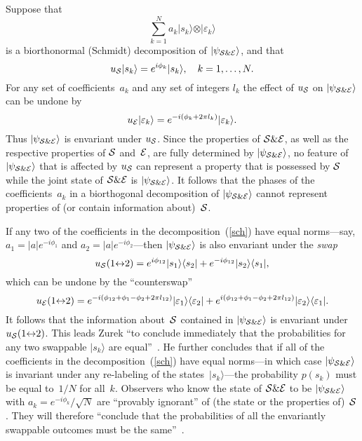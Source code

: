 \documentclass[12pt]{article}
\newcommand{\ket}[1]{\vert#1\rangle}
\newcommand{\ketbra}[2]{\vert#1\rangle\langle#2\vert}
\newcommand{\be}{\begin{equation}}
\newcommand{\ee}{\end{equation}}
\newcommand{\e}{\varepsilon}
\newcommand{\cS}{{\cal S}}
\newcommand{\E}{{\cal E}}
\begin{document}
Suppose that
\be
\sum_{k=1}^N a_k\ket{s_k}\otimes\ket{\e_k}\label{sch}
\ee
is a biorthonormal (Schmidt) decomposition of $\ket{\psi_{\cS\&\E}}$, and 
that
\be
u_\cS\ket{s_k}=e^{i\phi_k}\ket{s_k},\quad k=1,\dots,N.
\ee
For any set of coefficients~$a_k$ and any set of integers $l_k$ the effect of 
$u_\cS$ on $\ket{\psi_{\cS\&\E}}$ can be undone by
\be
u_\E\ket{\e_k}=e^{-i(\phi_k+2\pi l_k)}\ket{\e_k}.
\ee
Thus $\ket{\psi_{\cS\&\E}}$ is envariant under $u_\cS$. Since the properties 
of $\cS\&\E$, as well as the respective properties of $\cS$ and~$\E$, are fully 
determined by $\ket{\psi_{\cS\&\E}}$, no feature of $\ket{\psi_{\cS\&\E}}$ 
that is affected by $u_\cS$ can represent a property that is possessed by $\cS$ 
while the joint state of $\cS\&\E$ is $\ket{\psi_{\cS\&\E}}$. It follows that 
the phases of the coefficients~$a_k$ in a biorthogonal decomposition of 
$\ket{\psi_{\cS\&\E}}$ cannot represent properties of (or contain information 
about)~$\cS$.

If any two of the coefficients in the decomposition~(\ref{sch}) have equal 
norms---say, $a_1=|a|e^{-i\phi_1}$ and $a_2=|a|e^{-i\phi_2}$---then 
$\ket{\psi_{\cS\&\E}}$ is also envariant under the {\it swap\/}
\be
u_\cS(1{\leftrightarrow}2)=
e^{i\phi_{12}}\ketbra{s_1}{s_2}+e^{-i\phi_{12}}\ketbra{s_2}{s_1},
\ee
which can be undone by the ``counterswap''
\be
u_\E(1{\leftrightarrow}2)=
e^{-i(\phi_{12}+\phi_1-\phi_2+2\pi l_{12})}\ketbra{\e_1}{\e_2}
+e^{i(\phi_{12}+\phi_1-\phi_2+2\pi l_{12})}\ketbra{\e_2}{\e_1}.
\ee
It follows that the information about~$\cS$ contained in 
$\ket{\psi_{\cS\&\E}}$ is envariant under $u_\cS(1{\leftrightarrow}2)$. This 
leads Zurek ``to conclude immediately that the probabilities for any two 
swappable $\ket{s_k}$ are equal''~\cite{ZurekEnv}. He further concludes that 
if all of the coefficients in the decomposition~(\ref{sch}) have equal norms---in 
which case $\ket{\psi_{\cS\&\E}}$ is invariant under any re-labeling of the 
states~$\ket{s_k}$---the probability $p(s_k)$ must be equal to~$1/N$ for 
all~$k$. Observers who know the state of $\cS\&\E$ to be 
$\ket{\psi_{\cS\&\E}}$ with $a_k=e^{-i\phi_k}/\sqrt{N}$ are ``provably 
ignorant'' of (the state or the properties of)~$\cS$. They will therefore 
``conclude that the probabilities of all the envariantly swappable outcomes must 
be the same''~\cite{ZurekRMP}.
\end{document}
